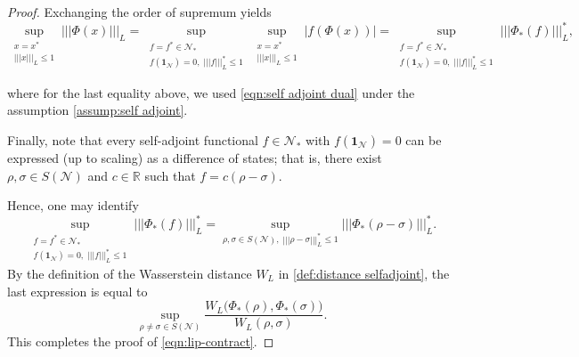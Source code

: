 \documentclass[11pt,reqno]{amsart}
\numberwithin{equation}{section}
\newcommand{\mb}{\mathbb}
\newcommand{\mc}{\mathcal}
\newcommand{\pw}[1]{{\color{blue}[PW: #1]}}
\begin{document}
\begin{proof}
Exchanging the order of supremum yields
\[
\sup_{\substack{x=x^* \\ |||x|||_L \le 1}} |||\Phi(x)|||_L = \sup_{\substack{f=f^* \in \mc N_* \\ f(\mathbf{1}_{\mc N}) = 0,\; |||f|||_L^* \le 1}} \sup_{\substack{x=x^* \\ |||x|||_L \le 1}} |f(\Phi(x))| = \sup_{\substack{f=f^* \in \mc N_* \\ f(\mathbf{1}_{\mc N}) = 0,\; |||f|||_L^* \le 1}} |||\Phi_*(f)|||_L^*,
\]

where for the last equality above, we used \eqref{eqn:self adjoint dual} under the assumption \eqref{assump:self adjoint}.

Finally, note that every self-adjoint functional $f\in \mc N_*$ with $f(\mathbf{1}_{\mc N}) = 0$ can be expressed (up to scaling) as a difference of states; that is, there exist $\rho,\sigma\in S(\mc N)$ and $c\in \mathbb{R}$ such that $f = c(\rho-\sigma)$. 

Hence, one may identify
\[
\sup_{\substack{f=f^* \in \mc N_* \\ f(\mathbf{1}_{\mc N}) = 0,\; |||f|||_L^* \le 1}} |||\Phi_*(f)|||_L^* = \sup_{\rho,\sigma \in S(\mc N),\; |||\rho-\sigma|||_L^* \le 1} |||\Phi_*(\rho-\sigma)|||_L^*.
\]
By the definition of the Wasserstein distance $W_L$ in \eqref{def:distance selfadjoint}, the last expression is equal to
\[
\sup_{\rho\neq \sigma \in S(\mc N)} \frac{W_L\big(\Phi_*(\rho),\Phi_*(\sigma)\big)}{W_L(\rho,\sigma)}.
\]
This completes the proof of \eqref{eqn:lip-contract}.
\end{proof}
\end{document}
